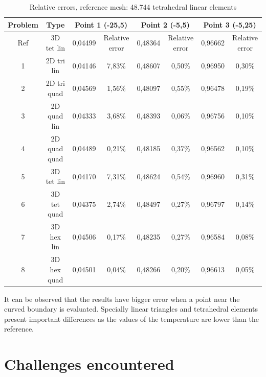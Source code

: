 \documentclass[paper=a4, fontsize=11pt]{article} %
\numberwithin{equation}{section} %
\numberwithin{figure}{section} %
\numberwithin{table}{section} %
\begin{document}
\begin{table}[]
\centering
\caption{Relative errors, reference mesh: 48.744 tetrahedral linear elements}
\label{my-label}
\begin{tabular}{|cc|cc|cc|cc|}
\hline
Problem & Type         & \multicolumn{2}{c|}{Point 1 (-25,5)} & \multicolumn{2}{c|}{Point 2 (-5,5)} & \multicolumn{2}{c|}{Point 3 (-5,25)} \\ \hline
Ref     & 3D tet lin   & 0,04499       & Relative error       & 0,48364       & Relative error      & 0,96662       & Relative error       \\
1       & 2D tri lin   & 0,04146       & 7,83\%               & 0,48607       & 0,50\%              & 0,96950       & 0,30\%               \\
2       & 2D tri quad  & 0,04569       & 1,56\%               & 0,48097       & 0,55\%              & 0,96478       & 0,19\%               \\
3       & 2D quad lin  & 0,04333       & 3,68\%               & 0,48393       & 0,06\%              & 0,96756       & 0,10\%               \\
4       & 2D quad quad & 0,04489       & 0,21\%               & 0,48185       & 0,37\%              & 0,96562       & 0,10\%               \\
5       & 3D tet lin   & 0,04170       & 7,31\%               & 0,48624       & 0,54\%              & 0,96960       & 0,31\%               \\
6       & 3D tet quad  & 0,04375       & 2,74\%               & 0,48497       & 0,27\%              & 0,96797       & 0,14\%               \\
7       & 3D hex lin   & 0,04506       & 0,17\%               & 0,48235       & 0,27\%              & 0,96584       & 0,08\%               \\
8       & 3D hex quad  & 0,04501       & 0,04\%               & 0,48266       & 0,20\%              & 0,96613       & 0,05\%               \\ \hline
\end{tabular}
\end{table}

It can be observed that the results have bigger error when a point near the curved boundary is evaluated. Specially linear triangles and tetrahedral elements present important differences as the values of the temperature are lower than the reference.

\section{\textbf{Challenges encountered}}
\end{document}
